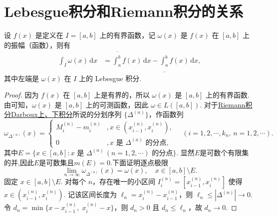 \documentclass[../../main.tex]{subfiles}%
\begin{document}
\section{Lebesgue积分和Riemann积分的关系}

\begin{lemma}\label{lemma:引理4.23}
设 \( f(x) \) 是定义在 \( I = [a,b] \) 上的有界函数，记 \( \omega(x) \) 是 \( f(x) \) 在 \( [a,b] \) 上的振幅（函数），则有
\begin{align*}
\int_I \omega(x) \, \mathrm{d}x &= \overline{\int_a^b} f(x) \, \mathrm{d}x - \underline{\int_a^b} f(x) \, \mathrm{d}x,
\end{align*}
其中左端是 \( \omega(x) \) 在 \( I \) 上的 Lebesgue 积分.
\end{lemma}
\begin{proof}

因为 \( f(x) \) 在 \( [a,b] \) 上是有界的，所以 \( \omega(x) \) 是 \( [a,b] \) 上的有界函数. 由可知，\( \omega(x) \) 是 \( [a,b] \) 上的可测函数，因此 \( \omega \in L([a,b]) \).
对于\hyperref[Basis of Analytics-definition:Riemann积分Darboux上下积分]{Riemann积分Darboux上、下积分}所说的分划序列 \( \{\Delta^{(n)}\} \)，作函数列
\[
\omega_{\Delta^{(n)}}(x) = 
\begin{cases} 
M_i^{(n)} - m_i^{(n)} &, x \in (x_{i-1}^{(n)}, x_i^{(n)}), \\
0 & ,x \text{ 是 } \Delta^{(n)} \text{ 的分点},
\end{cases}
\quad (i = 1,2,\cdots,k_n,\, n = 1,2,\cdots).
\]
其中\( E = \{ x \in [a,b] : x \text{ 是 } \Delta^{(n)} \, (n = 1,2,\cdots) \text{ 的分点} \} \).
显然$E$是可数个有限集的并,因此$E$是可数集且\( m(E) = 0 \).下面证明逐点极限
\[
\lim_{n \to \infty} \omega_{\Delta^{(n)}}(x) = \omega(x), \quad x \in [a,b] \setminus E.
\]
固定 \( x\in [a,b] \setminus E \). 对每个 \( n \)，存在唯一的小区间 \( I_i^{(n)} = [x_{i-1}^{(n)}, x_i^{(n)}] \) 使得 \( x\in (x_{i-1}^{(n)}, x_i^{(n)}) \). 记该区间长度为 \( \ell_n = x_i^{(n)} - x_{i-1}^{(n)} \)，则 \( \ell_n \leqslant |\Delta^{(n)}| \to 0 \). 令 \( d_n = \min\{x-x_{i-1}^{(n)},\; x_i^{(n)}-x\} \)，则 \( d_n>0 \) 且 \( d_n \leqslant \ell_n \)，故 \( d_n\to0 \).


\end{proof}
\end{document}
